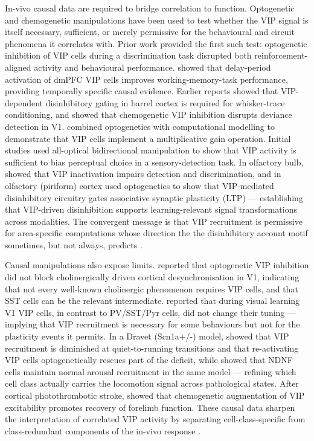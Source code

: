 \documentclass[11pt]{article}
\begin{document}
In-vivo causal data are required to bridge correlation to function. Optogenetic and chemogenetic manipulations have been used to test whether the VIP signal is itself necessary, sufficient, or merely permissive for the behavioural and circuit phenomena it correlates with. Prior work \citep{Pi2013} provided the first such test: optogenetic inhibition of VIP cells during a discrimination task disrupted both reinforcement-aligned activity and behavioural performance. \citet{Kamigaki2017} showed that delay-period activation of dmPFC VIP cells improves working-memory-task performance, providing temporally specific causal evidence. Earlier reports \citep{Krabbe2019} showed that VIP-dependent disinhibitory gating in barrel cortex is required for whisker-trace conditioning, and \citet{Bastos2023a} showed that chemogenetic VIP inhibition disrupts deviance detection in V1. \citet{Veit2023} combined optogenetics with computational modelling to demonstrate that VIP cells implement a multiplicative gain operation. Initial studies \citep{Myersjoseph2022} used all-optical bidirectional manipulation to show that VIP activity is sufficient to bias perceptual choice in a sensory-detection task. In olfactory bulb, \citet{Wang2022} showed that VIP inactivation impairs detection and discrimination, and in olfactory (piriform) cortex \citet{Cantobustos2022} used optogenetics to show that VIP-mediated disinhibitory circuitry gates associative synaptic plasticity (LTP) --- establishing that VIP-driven disinhibition supports learning-relevant signal transformations across modalities. The convergent message is that VIP recruitment is permissive for area-specific computations whose direction the the disinhibitory account motif sometimes, but not always, predicts \citep{Veit2023, Krabbe2019, Bastos2023a, Myersjoseph2022, Wang2022, Cantobustos2022}.

Causal manipulations also expose limits. \citet{Chen2015a} reported that optogenetic VIP inhibition did not block cholinergically driven cortical desynchronisation in V1, indicating that not every well-known cholinergic phenomenon requires VIP cells, and that SST cells can be the relevant intermediate. \citet{Khan2018a} reported that during visual learning V1 VIP cells, in contrast to PV/SST/Pyr cells, did not change their tuning --- implying that VIP recruitment is necessary for some behaviours but not for the plasticity events it permits. In a Dravet (Scn1a+/-) model, \citet{Goff2023} showed that VIP recruitment is diminished at quiet-to-running transitions and that re-activating VIP cells optogenetically rescues part of the deficit, while \citet{Liebergall2024} showed that NDNF cells maintain normal arousal recruitment in the same model --- refining which cell class actually carries the locomotion signal across pathological states. After cortical photothrombotic stroke, \citet{Motaharinia2021} showed that chemogenetic augmentation of VIP excitability promotes recovery of forelimb function. These causal data sharpen the interpretation of correlated VIP activity by separating cell-class-specific from class-redundant components of the in-vivo response \citep{Chen2015a, Khan2018a, Goff2023, Motaharinia2021}.
\end{document}
